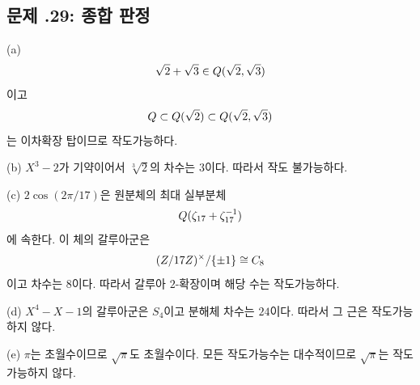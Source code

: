 \subsection*{문제 \thechapter.29: 종합 판정}

\begin{solution}
(a)
\[
  \sqrt2+\sqrt3\in Q(\sqrt2,\sqrt3)
\]
이고
\[
  Q\subset Q(\sqrt2)\subset Q(\sqrt2,\sqrt3)
\]
는 이차확장 탑이므로 작도가능하다.

(b) $X^3-2$가 기약이어서 $\sqrt[3]2$의 차수는 $3$이다. 따라서 작도 불가능하다.

(c) $2\cos(2\pi/17)$은 원분체의 최대 실부분체
\[
  Q(\zeta_{17}+\zeta_{17}^{-1})
\]
에 속한다. 이 체의 갈루아군은
\[
  (Z/17Z)^\times/\{\pm1\}\cong C_8
\]
이고 차수는 $8$이다. 따라서 갈루아 $2$-확장이며 해당 수는 작도가능하다.

(d) $X^4-X-1$의 갈루아군은 $S_4$이고 분해체 차수는 $24$이다. 따라서 그 근은 작도가능하지 않다.

(e) $\pi$는 초월수이므로 $\sqrt\pi$도 초월수이다. 모든 작도가능수는 대수적이므로 $\sqrt\pi$는 작도가능하지 않다.
\end{solution}
